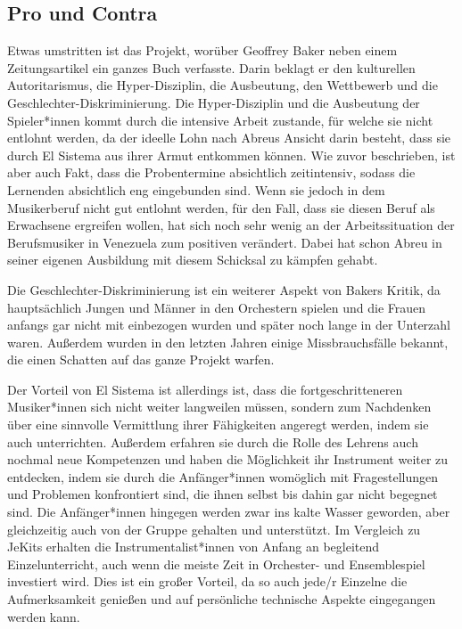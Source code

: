 \subsection{Pro und Contra}
Etwas umstritten ist das Projekt, worüber Geoffrey Baker neben einem
Zeitungsartikel ein ganzes Buch verfasste. Darin beklagt er den kulturellen
Autoritarismus, die Hyper-Disziplin, die Ausbeutung, den Wettbewerb und die
Geschlechter-Diskriminierung. Die Hyper-Disziplin und die Ausbeutung der
Spieler*innen kommt durch die intensive Arbeit zustande, für welche sie nicht
entlohnt werden, da der ideelle Lohn nach Abreus Ansicht darin besteht, dass sie
durch El Sistema aus ihrer Armut entkommen können. Wie zuvor beschrieben, ist
aber auch Fakt, dass die Probentermine absichtlich zeitintensiv, sodass die
Lernenden absichtlich eng eingebunden sind. Wenn sie jedoch in dem Musikerberuf
nicht gut entlohnt werden, für den Fall, dass sie diesen Beruf als Erwachsene
ergreifen wollen, hat sich noch sehr wenig an der Arbeitssituation der
Berufsmusiker in Venezuela zum positiven verändert. Dabei hat schon Abreu in
seiner eigenen Ausbildung mit diesem Schicksal zu kämpfen gehabt.

Die
Geschlechter-Diskriminierung ist ein weiterer Aspekt von Bakers Kritik, da
hauptsächlich Jungen und Männer in den Orchestern spielen und die Frauen anfangs
gar nicht mit einbezogen wurden und später noch lange in der Unterzahl waren.
Außerdem wurden in den letzten Jahren einige Missbrauchsfälle bekannt,
die einen Schatten auf das ganze Projekt warfen. 

Der Vorteil von El Sistema ist allerdings ist, dass die fortgeschritteneren
Musiker*innen sich nicht weiter langweilen müssen, sondern zum Nachdenken über
eine sinnvolle Vermittlung ihrer Fähigkeiten angeregt werden, indem sie auch
unterrichten. Außerdem erfahren sie durch die Rolle des Lehrens auch nochmal
neue Kompetenzen und haben die Möglichkeit ihr Instrument weiter zu entdecken,
indem sie durch die Anfänger*innen womöglich mit Fragestellungen und Problemen
konfrontiert sind, die ihnen selbst bis dahin gar nicht begegnet sind. Die
Anfänger*innen hingegen werden zwar ins kalte Wasser geworden, aber gleichzeitig
auch von der Gruppe gehalten und unterstützt.
\autocite[160]{roebke_mantilla:vom_wilden_lernen}
Im Vergleich zu JeKits erhalten die Instrumentalist*innen von Anfang an
begleitend Einzelunterricht, auch wenn die meiste Zeit in Orchester- und
Ensemblespiel investiert wird. Dies ist ein großer Vorteil, da so auch jede/r
Einzelne die Aufmerksamkeit genießen und auf persönliche technische Aspekte
eingegangen werden kann. 
